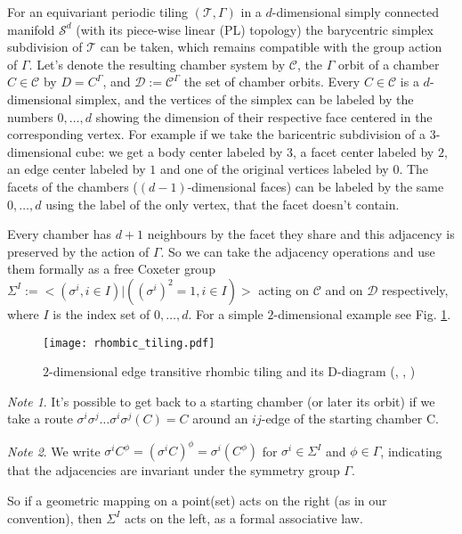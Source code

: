 \documentclass[12pt,a4paper]{article}
\numberwithin{equation}{section}
\theoremstyle{plain}%
\theoremstyle{definition}
\theoremstyle{remark}
\newtheorem*{note}{Note}
\begin{document}
For an equivariant periodic tiling $(\mathcal{T},\Gamma)$ in a $d$-dimensional
simply connected manifold $\mathcal{S}^d$ (with its piece-wise linear (PL)
topology) the barycentric simplex subdivision of $\mathcal{T}$ can be taken,
which remains compatible with the group action of $\Gamma$. Let's denote the
resulting chamber system by $\mathcal{C}$, the $\Gamma$ orbit of a chamber $C\in
\mathcal{C}$ by $D=C^\Gamma$, and $\mathcal{D}:= \mathcal{C}^\Gamma$ the set of
chamber orbits. Every $C\in \mathcal{C}$ is a $d$-dimensional simplex, and the
vertices of the simplex can be labeled by the numbers $0,\ldots,d$ showing the
dimension of their respective face centered in the corresponding vertex. For
example if we take the baricentric subdivision of a $3$-dimensional cube: we get
a body center labeled by $3$, a facet center labeled by $2$, an edge center
labeled by $1$ and one of the original vertices labeled by $0$. The facets of
the chambers ($(d-1)$-dimensional faces) can be labeled by the same $0,\ldots,d$
using the label of the only vertex, that the facet doesn't contain.

Every chamber has $d+1$ neighbours by the facet they share and this adjacency is
preserved by the action of $\Gamma$. So we can take the adjacency operations and
use them formally as a free Coxeter group $\Sigma^I := <(\sigma^i, i\in I) |
((\sigma^i)^2=1, i\in I)>$ acting on $\mathcal{C}$ and on $\mathcal{D}$
respectively, where $I$ is the index set of $0,\ldots,d$. For a simple
$2$-dimensional example see Fig. \ref{fig:rhombic_tiling}.

\begin{figure}
  \caption{\label{fig:rhombic_tiling} $2$-dimensional edge transitive rhombic tiling and its
  D-diagram (\usebox{\LegendVertex}, \usebox{\LegendEdge}, \usebox{\LegendFace})}
  \center
  \texttt{[image: rhombic\_tiling.pdf]}
\end{figure}

\begin{note}
  It's possible to get back to a starting chamber (or later its orbit) if we
  take a route $\sigma^i\sigma^j\ldots\sigma^i\sigma^j(C) = C$ around an
  $ij$-edge of the starting chamber C.
\end{note}

\begin{note}
  We write $\sigma^iC^\phi=(\sigma^iC)^\phi=\sigma^i(C^\phi)$ for
  $\sigma^i\in\Sigma^I$ and $\phi\in\Gamma$, indicating that the adjacencies are
  invariant under the symmetry group $\Gamma$.
  
  So if a geometric mapping on a point(set) acts on the right (as in our
  convention), then $\Sigma^I$ acts on the left, as a formal associative
  law.
\end{note}
\end{document}

